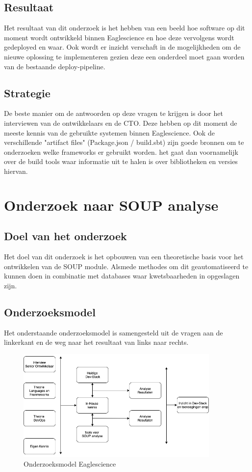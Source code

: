 \subsection{Resultaat}
Het resultaat van dit onderzoek is het hebben van een beeld hoe software op dit moment wordt ontwikkeld binnen Eaglescience en hoe deze vervolgens wordt gedeployed en waar. Ook wordt er inzicht verschaft in de mogelijkheden om de nieuwe oplossing te implementeren gezien deze een onderdeel moet gaan worden van de bestaande deploy-pipeline.
\subsection{Strategie}
De beste manier om de antwoorden op deze vragen te krijgen is door het interviewen van de ontwikkelaars en de CTO. Deze hebben op dit moment de meeste kennis van de gebruikte systemen binnen Eaglescience. Ook de verschillende "artifact files" (Package.json / build.sbt) zijn goede bronnen om te onderzoeken welke frameworks er gebruikt worden. het gaat dan voornamelijk over de build tools waar informatie uit te halen is over bibliotheken en versies hiervan.

\section{Onderzoek naar SOUP analyse}
\subsection{Doel van het onderzoek}
Het doel van dit onderzoek is het opbouwen van een theoretische basis voor het ontwikkelen van de SOUP module. Alsmede methodes om dit geautomatiseerd te kunnen doen in combinatie met databases waar kwetsbaarheden in opgeslagen zijn.


\subsection{Onderzoeksmodel}
Het onderstaande onderzoeksmodel is samengesteld uit de vragen aan de linkerkant en de weg naar het resultaat van links naar rechts.\\
\begin{figure}[h!]
\myfloatalign
\includegraphics[width=10cm]{gfx/OnderzoeksmodelES}
\caption{Onderzoeksmodel Eaglescience}
\label{fig:Onderzoeks model Dev-Stack}
\end{figure}

